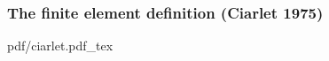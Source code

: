 \begin{frame}
  \frametitle{The finite element definition (Ciarlet 1975)}

  \def\svgwidth{1.2\textwidth}
  {pdf/ciarlet.pdf_tex}

\end{frame}
